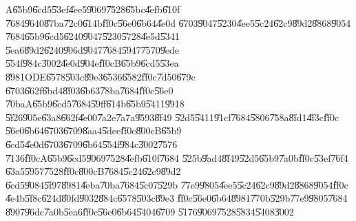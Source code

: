 \documentclass[12pt,a4paper]{article}
\begin{document}
A\U{65b9}\U{6cd5}\U{53ef}\U{4ee5}\U{9069}\U{7528}\U{65bc}\U{4efb}\U{610f}%
\U{7684}\U{9640}\U{87ba}\U{72c0}\U{614b}\U{ff0c}\U{56e0}\U{6b64}\U{4e0d}%
\U{6703}\U{9047}\U{5230}\U{4ee5}\U{5c24}\U{62c9}\U{89d2}\U{8868}\U{9054}%
\U{7684}\U{65b9}\U{6cd5}\U{6240}\U{9047}\U{5230}\U{5728}\U{4e5d}\U{5341}%
\U{5ea6}\U{89d2}\U{6240}\U{906d}\U{9047}\U{7684}\U{5947}\U{7570}\U{9ede}%
\U{554f}\U{984c}\U{3002}\U{4e0d}\U{904e}\U{ff0c}B\U{65b9}\U{6cd5}\U{53ea}%
\U{8981}ODE\U{6578}\U{503c}\U{89e3}\U{6536}\U{6582}\U{ff0c}\U{7d50}\U{679c}%
\U{6703}\U{662f}\U{6bd4}\U{8f03}\U{6b63}\U{78ba}\U{7684}\U{ff0c}\U{56e0}%
\U{70ba}A\U{65b9}\U{6cd5}\U{7684}\U{59ff}\U{614b}\U{65b9}\U{5411}\U{9918}%
\U{5f26}\U{905e}\U{63a8}\U{662f}\U{4e00}\U{7a2e}\U{7a7a}\U{9593}\U{8f49}%
\U{52d5}\U{5411}\U{91cf}\U{7684}\U{5806}\U{758a}\U{8fd1}\U{4f3c}\U{ff0c}%
\U{56e0}\U{6b64}\U{6703}\U{6709}\U{8aa4}\U{5dee}\U{ff0c}\U{800c}B\U{65b9}%
\U{6cd5}\U{4e0d}\U{6703}\U{6709}\U{6b64}\U{554f}\U{984c}\U{3002}\U{7576}%
\U{7136}\U{ff0c}A\U{65b9}\U{6cd5}\U{9069}\U{7528}\U{4efb}\U{610f}\U{7684}%
\U{525b}\U{9ad4}\U{8f49}\U{52d5}\U{65b9}\U{7a0b}\U{ff0c}\U{53ef}\U{76f4}%
\U{63a5}\U{5957}\U{7528}\U{ff0c}\U{800c}B\U{7684}\U{5c24}\U{62c9}\U{89d2}%
\U{6cd5}\U{9084}\U{5f97}\U{8981}\U{4eba}\U{70ba}\U{7684}\U{5c07}\U{529b}%
\U{77e9}\U{9805}\U{4ee5}\U{5c24}\U{62c9}\U{89d2}\U{8868}\U{9054}\U{ff0c}%
\U{4e4b}\U{5f8c}\U{624d}\U{80fd}\U{9032}\U{884c}\U{6578}\U{503c}\U{89e3}%
\U{ff0c}\U{56e0}\U{6b64}\U{8981}\U{770b}\U{529b}\U{77e9}\U{9805}\U{7684}%
\U{8907}\U{96dc}\U{7a0b}\U{5ea6}\U{ff0c}\U{56e0}\U{6b64}\U{5404}\U{6709}%
\U{5176}\U{9069}\U{7528}\U{5834}\U{5408}\U{3002}

\bigskip
\end{document}
